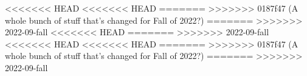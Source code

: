 \documentclass{../../oss-apphys-exam}
\begin{document}
\begin{multicols*}{2}
\begin{questions}
<<<<<<< HEAD
<<<<<<< HEAD
=======
>>>>>>> 0187f47 (A whole bunch of stuff that's changed for Fall of 2022?)
=======
>>>>>>> 2022-09-fall
%      
%
%
<<<<<<< HEAD
=======
>>>>>>> 2022-09-fall
%    
<<<<<<< HEAD
<<<<<<< HEAD
=======
>>>>>>> 0187f47 (A whole bunch of stuff that's changed for Fall of 2022?)
=======
>>>>>>> 2022-09-fall
%    

\end{questions}
\end{multicols*}
\end{document}
